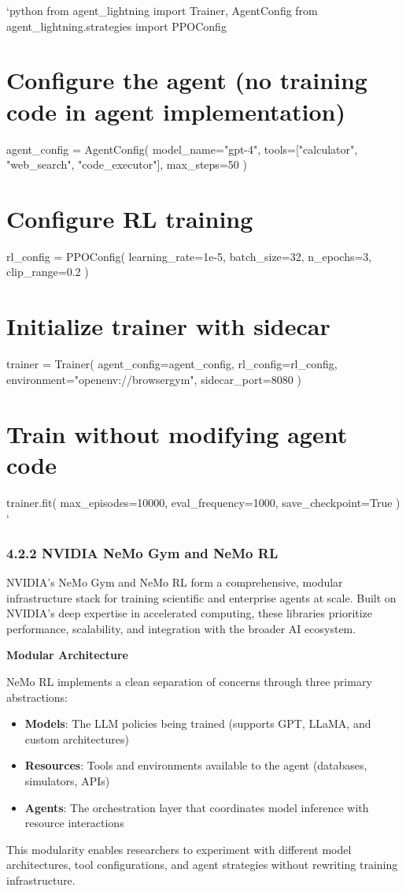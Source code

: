 \texttt{}`python
from agent_lightning import Trainer, AgentConfig
from agent_lightning.strategies import PPOConfig

\section{Configure the agent (no training code in agent implementation)}
agent_config = AgentConfig(
    model_name="gpt-4",
    tools=["calculator", "web_search", "code_executor"],
    max_steps=50
)

\section{Configure RL training}
rl_config = PPOConfig(
    learning_rate=1e-5,
    batch_size=32,
    n_epochs=3,
    clip_range=0.2
)

\section{Initialize trainer with sidecar}
trainer = Trainer(
    agent_config=agent_config,
    rl_config=rl_config,
    environment="openenv://browsergym",
    sidecar_port=8080
)

\section{Train without modifying agent code}
trainer.fit(
    max_episodes=10000,
    eval_frequency=1000,
    save_checkpoint=True
)
\texttt{}`

\subsubsection{4.2.2 NVIDIA NeMo Gym and NeMo RL}

NVIDIA's NeMo Gym and NeMo RL form a comprehensive, modular infrastructure stack for training scientific and enterprise agents at scale. Built on NVIDIA's deep expertise in accelerated computing, these libraries prioritize performance, scalability, and integration with the broader AI ecosystem.

\textbf{Modular Architecture}

NeMo RL implements a clean separation of concerns through three primary abstractions:

\begin{itemize}
    \item \textbf{Models}: The LLM policies being trained (supports GPT, LLaMA, and custom architectures)
    \item \textbf{Resources}: Tools and environments available to the agent (databases, simulators, APIs)
    \item \textbf{Agents}: The orchestration layer that coordinates model inference with resource interactions

\end{itemize}
This modularity enables researchers to experiment with different model architectures, tool configurations, and agent strategies without rewriting training infrastructure.

